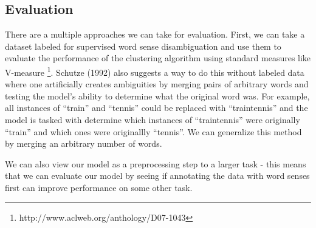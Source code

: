 \documentclass[11pt,letterpaper]{article}
\begin{document}
\subsection{Evaluation}
There are a multiple approaches we can take for evaluation. First, we can take a dataset labeled for supervised word sense disambiguation and use them to evaluate the performance of the clustering algorithm using standard measures like V-measure \footnote{http://www.aclweb.org/anthology/D07-1043}. Schutze (1992) also suggests a way to do this without labeled data where one artificially creates ambiguities by merging pairs of arbitrary words and testing the model's ability to determine what the original word was. For example, all instances of ``train'' and ``tennis'' could be replaced with ``traintennis'' and the model is tasked with determine which instances of ``traintennis'' were originally ``train'' and which ones were originallly ``tennis''. We can generalize this method by merging an arbitrary number of words. 

We can also view our model as a preprocessing step to a larger task - this means that we can evaluate our model by seeing if annotating the data with word senses first can improve performance on some other task.  
\end{document}
